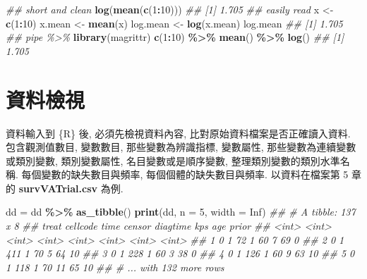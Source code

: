 \documentclass[
]{book}
\newenvironment{Shaded}{\begin{snugshade}}{\end{snugshade}}
\newcommand{\CommentTok}[1]{\textcolor[rgb]{0.56,0.35,0.01}{\textit{#1}}}
\newcommand{\DataTypeTok}[1]{\textcolor[rgb]{0.13,0.29,0.53}{#1}}
\newcommand{\DecValTok}[1]{\textcolor[rgb]{0.00,0.00,0.81}{#1}}
\newcommand{\KeywordTok}[1]{\textcolor[rgb]{0.13,0.29,0.53}{\textbf{#1}}}
\newcommand{\NormalTok}[1]{#1}
\newcommand{\OperatorTok}[1]{\textcolor[rgb]{0.81,0.36,0.00}{\textbf{#1}}}
\newcommand{\OtherTok}[1]{\textcolor[rgb]{0.56,0.35,0.01}{#1}}
\newcommand{\StringTok}[1]{\textcolor[rgb]{0.31,0.60,0.02}{#1}}
\begin{document}
\begin{Shaded}
\begin{Highlighting}[]
\CommentTok{\#\# short and clean }
\KeywordTok{log}\NormalTok{(}\KeywordTok{mean}\NormalTok{(}\KeywordTok{c}\NormalTok{(}\DecValTok{1}\OperatorTok{:}\DecValTok{10}\NormalTok{)))}
\CommentTok{\#\# [1] 1.705}
\CommentTok{\#\# easily read }
\NormalTok{x \textless{}{-}}\StringTok{ }\KeywordTok{c}\NormalTok{(}\DecValTok{1}\OperatorTok{:}\DecValTok{10}\NormalTok{)}
\NormalTok{x.mean \textless{}{-}}\StringTok{ }\KeywordTok{mean}\NormalTok{(x)}
\NormalTok{log.mean \textless{}{-}}\StringTok{ }\KeywordTok{log}\NormalTok{(x.mean)}
\NormalTok{log.mean}
\CommentTok{\#\# [1] 1.705}
\CommentTok{\#\# pipe \%\textgreater{}\%}
\KeywordTok{library}\NormalTok{(magrittr)}
\KeywordTok{c}\NormalTok{(}\DecValTok{1}\OperatorTok{:}\DecValTok{10}\NormalTok{) }\OperatorTok{\%\textgreater{}\%}\StringTok{ }\KeywordTok{mean}\NormalTok{() }\OperatorTok{\%\textgreater{}\%}\StringTok{ }\KeywordTok{log}\NormalTok{()}
\CommentTok{\#\# [1] 1.705}
\end{Highlighting}
\end{Shaded}

\hypertarget{ux8cc7ux6599ux6aa2ux8996}{%
\section{資料檢視}\label{ux8cc7ux6599ux6aa2ux8996}}

資料輸入到 \{R\} 後,
必須先檢視資料內容, 比對原始資料檔案是否正確讀入資料.
包含觀測值數目, 變數數目,
那些變數為辨識指標,
變數屬性, 那些變數為連續變數或類別變數,
類別變數屬性, 名目變數或是順序變數,
整理類別變數的類別水準名稱.
每個變數的缺失數目與頻率,
每個個體的缺失數目與頻率.
以資料在檔案第 5 章的 \textbf{survVATrial.csv} 為例.

\begin{Shaded}
\begin{Highlighting}[]
\NormalTok{dd =}\StringTok{ }\NormalTok{dd }\OperatorTok{\%\textgreater{}\%}\StringTok{ }\KeywordTok{as\_tibble}\NormalTok{()}
\KeywordTok{print}\NormalTok{(dd, }\DataTypeTok{n =} \DecValTok{5}\NormalTok{, }\DataTypeTok{width =} \OtherTok{Inf}\NormalTok{)}
\CommentTok{\#\# \# A tibble: 137 x 8}
\CommentTok{\#\#   treat cellcode  time censor diagtime   kps   age prior}
\CommentTok{\#\#   \textless{}int\textgreater{}    \textless{}int\textgreater{} \textless{}int\textgreater{}  \textless{}int\textgreater{}    \textless{}int\textgreater{} \textless{}int\textgreater{} \textless{}int\textgreater{} \textless{}int\textgreater{}}
\CommentTok{\#\# 1     0        1    72      1       60     7    69     0}
\CommentTok{\#\# 2     0        1   411      1       70     5    64    10}
\CommentTok{\#\# 3     0        1   228      1       60     3    38     0}
\CommentTok{\#\# 4     0        1   126      1       60     9    63    10}
\CommentTok{\#\# 5     0        1   118      1       70    11    65    10}
\CommentTok{\#\# \# ... with 132 more rows}
\end{Highlighting}
\end{Shaded}
\end{document}
